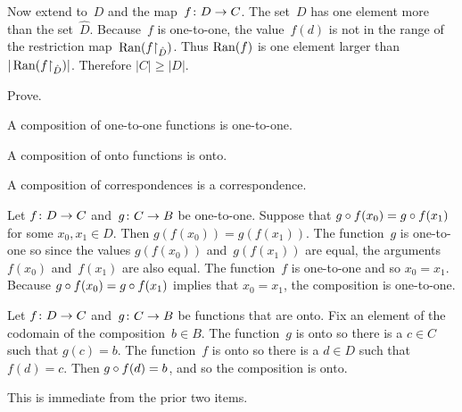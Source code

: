 \documentclass{ibl}  %
\begin{document}
\begin{ex}
\begin{ans}
\begin{exes}
  Now extend to~$D$ and the map~$\mbox{$f\colon D\to C$}$.
  The set~$D$ has one element more than the set~$\hat{D}$.
  Because~$f$ is one-to-one, the value~$f(d)$ is not in 
  the range of the restriction map~$\operatorname{Ran}({f}\mathord\upharpoonright_{\hat{D}})$.
  Thus $\operatorname{Ran}(f)$ is one element larger than
  $|\operatorname{Ran}({f}\mathord\upharpoonright_{\hat{D}})|$.
  Therefore $|C|\geq|D|$.
\end{exes}
\end{ans}
\end{ex}

\begin{ex} \label{InteractionOneToONeOntoWithComposition}
Prove.
\begin{exes}
\item A composition of one-to-one functions is one-to-one.
\item A composition of onto functions is onto.
\item A composition of correspondences is a correspondence.    
\end{exes}
\begin{ans}
\begin{exes}
\item Let $\mbox{$f\colon D\to C$}$ and~$\mbox{$g\colon C\to B$}$ be one-to-one.
  Suppose that $g\mathbin{\circ} f(x_0)=g\mathbin{\circ} f(x_1)$ for
  some $x_0,x_1\in D$.
  Then $g(f(x_0))=g(f(x_1))$.
  The function~$g$ is one-to-one so since the values $g(f(x_0))$ 
  and~$g(f(x_1))$ are equal, the arguments $f(x_0)$ and~$f(x_1)$ are
  also equal.
  The function~$f$ is one-to-one and so $x_0=x_1$.
  Because $g\mathbin{\circ} f(x_0)=g\mathbin{\circ} f(x_1)$ implies that
  $x_0=x_1$, the composition is one-to-one.
\item Let $\mbox{$f\colon D\to C$}$ and~$\mbox{$g\colon C\to B$}$ be functions that are onto.
  Fix an element of the codomain of the composition~$b\in B$.
  The function~$g$ is onto so there is a $c\in C$ such that $g(c)=b$.
  The function~$f$ is onto so there is a $d\in D$ such that $f(d)=c$.
  Then $g\mathbin{\circ} f(d)=b$, and so the composition is onto.
\item This is immediate from the prior two items. 
\end{exes}
\end{ans}
\end{ex}
\end{document}
